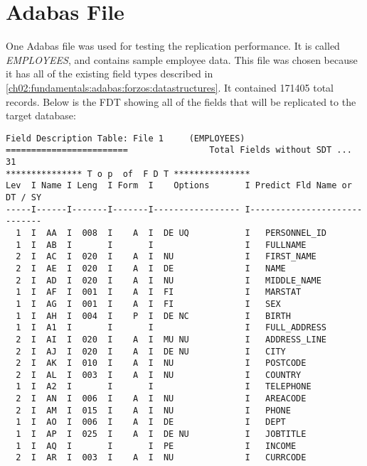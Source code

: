 \section{Adabas File}
\label{ch05:methodology:adabasfile}
One Adabas file was used for testing the replication performance. It is called \textit{EMPLOYEES}, and contains sample employee data. This file was chosen because it has all of the existing field types described in \ref{ch02:fundamentals:adabas:forzos:datastructures}. It contained 171405 total records. Below is the \ac{FDT} showing all of the fields that will be replicated to the target database:
\begin{verbatim}
Field Description Table: File 1     (EMPLOYEES)                              
========================                Total Fields without SDT ... 31      
*************** T o p  of  F D T ***************                             
Lev  I Name I Leng  I Form  I    Options       I Predict Fld Name or DT / SY 
-----I------I-------I-------I----------------- I-----------------------------
  1  I  AA  I  008  I    A  I  DE UQ           I   PERSONNEL_ID              
  1  I  AB  I       I       I                  I   FULLNAME                  
  2  I  AC  I  020  I    A  I  NU              I   FIRST_NAME                
  2  I  AE  I  020  I    A  I  DE              I   NAME                      
  2  I  AD  I  020  I    A  I  NU              I   MIDDLE_NAME               
  1  I  AF  I  001  I    A  I  FI              I   MARSTAT                   
  1  I  AG  I  001  I    A  I  FI              I   SEX                       
  1  I  AH  I  004  I    P  I  DE NC           I   BIRTH                     
  1  I  A1  I       I       I                  I   FULL_ADDRESS              
  2  I  AI  I  020  I    A  I  MU NU           I   ADDRESS_LINE              
  2  I  AJ  I  020  I    A  I  DE NU           I   CITY                      
  2  I  AK  I  010  I    A  I  NU              I   POSTCODE                  
  2  I  AL  I  003  I    A  I  NU              I   COUNTRY                   
  1  I  A2  I       I       I                  I   TELEPHONE                 
  2  I  AN  I  006  I    A  I  NU              I   AREACODE                  
  2  I  AM  I  015  I    A  I  NU              I   PHONE                     
  1  I  AO  I  006  I    A  I  DE              I   DEPT                      
  1  I  AP  I  025  I    A  I  DE NU           I   JOBTITLE                  
  1  I  AQ  I       I       I  PE              I   INCOME                    
  2  I  AR  I  003  I    A  I  NU              I   CURRCODE                  

\end{verbatim}
